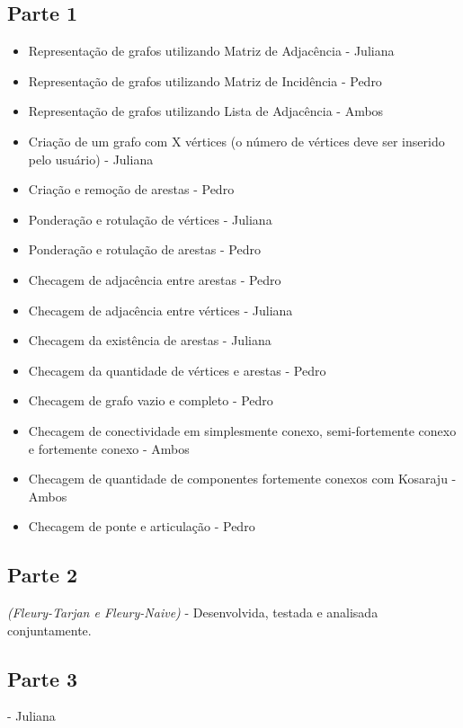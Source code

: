 \documentclass[12pt]{article}
\begin{document}
\subsection*{Parte 1}
\begin{itemize}
    \item Representação de grafos utilizando Matriz de Adjacência - Juliana
    \item Representação de grafos utilizando Matriz de Incidência - Pedro
    \item Representação de grafos utilizando Lista de Adjacência - Ambos
\end{itemize}

\begin{itemize}
    \item Criação de um grafo com X vértices (o número de vértices deve ser inserido pelo usuário) - Juliana
    \item Criação e remoção de arestas - Pedro
    \item Ponderação e rotulação de vértices - Juliana
    \item Ponderação e rotulação de arestas - Pedro
    \item Checagem de adjacência entre arestas - Pedro
    \item Checagem de adjacência entre vértices - Juliana
    \item Checagem da existência de arestas - Juliana
    \item Checagem da quantidade de vértices e arestas - Pedro
    \item Checagem de grafo vazio e completo - Pedro
    \item Checagem de conectividade em simplesmente conexo, semi-fortemente conexo e fortemente conexo - Ambos
    \item Checagem de quantidade de componentes fortemente conexos com Kosaraju - Ambos
    \item Checagem de ponte e articulação - Pedro
\end{itemize}

\subsection*{Parte 2} 
\textit{(Fleury-Tarjan e Fleury-Naive)} - Desenvolvida, testada e analisada conjuntamente.

\subsection*{Parte 3} - Juliana
\end{document}

